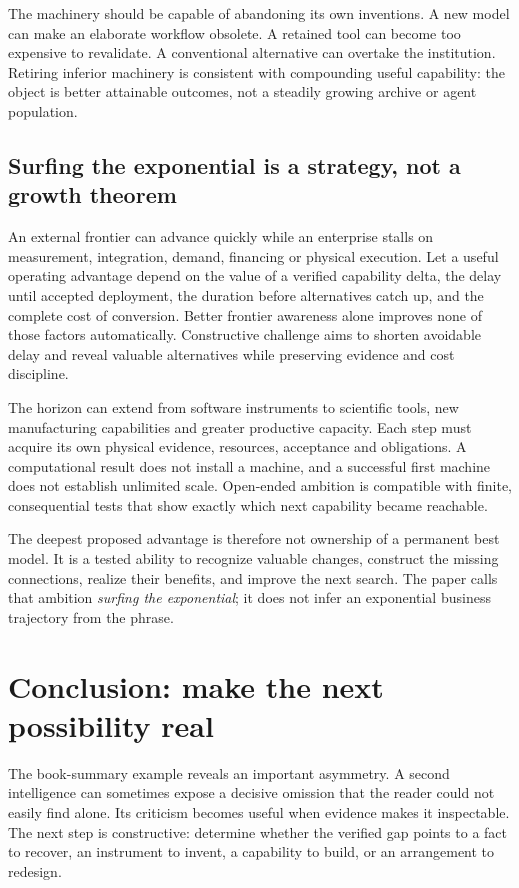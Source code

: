 The machinery should be capable of abandoning its own inventions. A new model can make an elaborate workflow obsolete. A retained tool can become too expensive to revalidate. A conventional alternative can overtake the institution. Retiring inferior machinery is consistent with compounding useful capability: the object is better attainable outcomes, not a steadily growing archive or agent population.

\subsection{Surfing the exponential is a strategy, not a growth theorem}
An external frontier can advance quickly while an enterprise stalls on measurement, integration, demand, financing or physical execution. Let a useful operating advantage depend on the value of a verified capability delta, the delay until accepted deployment, the duration before alternatives catch up, and the complete cost of conversion. Better frontier awareness alone improves none of those factors automatically. Constructive challenge aims to shorten avoidable delay and reveal valuable alternatives while preserving evidence and cost discipline.

The horizon can extend from software instruments to scientific tools, new manufacturing capabilities and greater productive capacity. Each step must acquire its own physical evidence, resources, acceptance and obligations. A computational result does not install a machine, and a successful first machine does not establish unlimited scale. Open-ended ambition is compatible with finite, consequential tests that show exactly which next capability became reachable.

The deepest proposed advantage is therefore not ownership of a permanent best model. It is a tested ability to recognize valuable changes, construct the missing connections, realize their benefits, and improve the next search. The paper calls that ambition \emph{surfing the exponential}; it does not infer an exponential business trajectory from the phrase.

\section{Conclusion: make the next possibility real}
The book-summary example reveals an important asymmetry. A second intelligence can sometimes expose a decisive omission that the reader could not easily find alone. Its criticism becomes useful when evidence makes it inspectable. The next step is constructive: determine whether the verified gap points to a fact to recover, an instrument to invent, a capability to build, or an arrangement to redesign.

